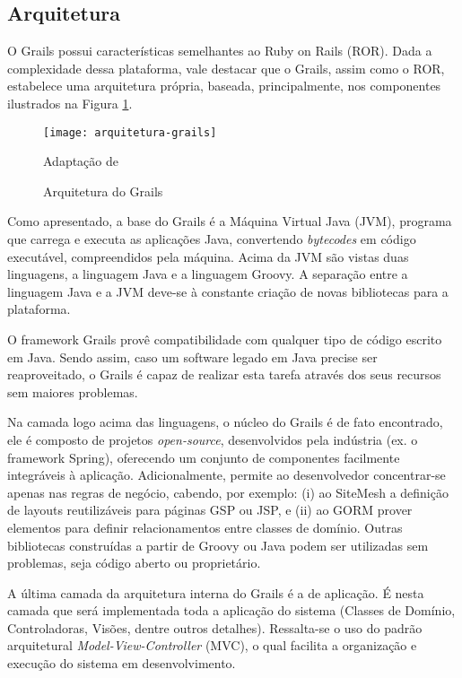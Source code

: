 \subsection{Arquitetura}

O Grails possui características semelhantes ao Ruby on Rails (ROR). Dada a complexidade dessa plataforma, vale destacar que o Grails, assim como o ROR, estabelece uma arquitetura própria, baseada, principalmente, nos componentes ilustrados na Figura \ref{arquitetura-grails}. 

\graphicspath{{figuras/}}
\begin{figure}[H]
\centering
\texttt{[image: arquitetura-grails]}
\caption{Arquitetura do Grails}{Adaptação de \cite{juddbeginning2008}} 
\label{arquitetura-grails}
\end{figure}

Como apresentado, a base do Grails é a Máquina Virtual Java (JVM), programa que carrega e executa as aplicações Java, convertendo \textit{bytecodes} em código executável, compreendidos pela máquina. Acima da JVM são vistas duas linguagens, a linguagem Java e a linguagem Groovy. A separação entre a linguagem Java e a JVM deve-se à constante criação de novas bibliotecas para a plataforma.

O framework Grails provê compatibilidade com qualquer tipo de código escrito em Java. Sendo assim, caso um software legado em Java precise ser reaproveitado, o Grails é capaz de realizar esta tarefa através dos seus recursos sem maiores problemas. 

Na camada logo acima das linguagens, o núcleo do Grails é de fato encontrado, ele é composto de projetos \textit{open-source}, desenvolvidos pela indústria (ex. o framework Spring), oferecendo um conjunto de componentes facilmente integráveis à aplicação. Adicionalmente, permite ao desenvolvedor concentrar-se apenas nas regras de negócio, cabendo, por exemplo: (i) ao SiteMesh a definição de layouts reutilizáveis para páginas GSP ou JSP, e (ii) ao GORM prover elementos para definir relacionamentos entre classes de domínio. Outras bibliotecas construídas a partir de Groovy ou Java podem ser utilizadas sem problemas, seja código aberto ou proprietário.

A última camada da arquitetura interna do Grails é a de aplicação. É nesta camada que será implementada toda a aplicação do sistema (Classes de Domínio, Controladoras, Visões, dentre outros detalhes). Ressalta-se o uso do padrão arquitetural \textit{Model-View-Controller} (MVC), o qual facilita a organização e execução do sistema em desenvolvimento.

